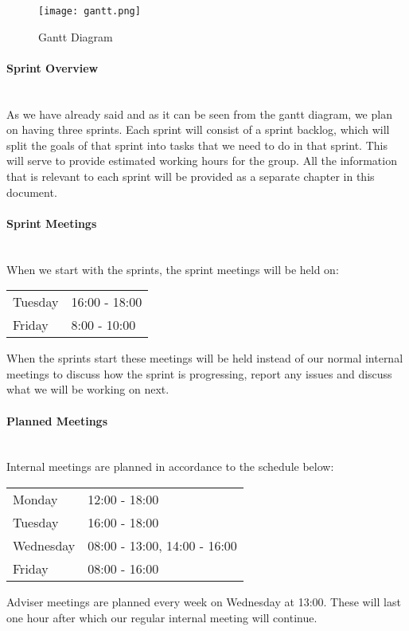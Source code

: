 \documentclass[../document.tex]{subfiles}
\begin{document}
\begin{figure}[H]
\centering
\texttt{[image: gantt.png]}
\caption{Gantt Diagram}
\end{figure}

\paragraph{Sprint Overview} \ \\
As we have already said and as it can be seen from the gantt diagram, we plan on having three sprints. Each sprint will consist of a sprint backlog, which will split the goals of that sprint into tasks that we need to do in that sprint. This will serve to provide estimated working hours for the group. All the information that is relevant to each sprint will be provided as a separate chapter in this document. 

\paragraph{Sprint Meetings} \ \\
When we start with the sprints, the sprint meetings will be held on:

\begin{table}[H]
\begin{tabular}{ll}
\hline
Tuesday	&	16:00 - 18:00 \\
Friday		&	8:00 - 10:00 \\
\hline
\end{tabular}
\end{table}
When the sprints start these meetings will be held instead of our normal internal meetings to discuss how the sprint is progressing, report any issues and discuss what we will be working on next.

\paragraph{Planned Meetings} \ \\
Internal meetings are planned in accordance to the schedule below:

\begin{table}[H]
\begin{tabular}{ll}
\hline
Monday 	&	12:00 - 18:00 \\
Tuesday 	&	16:00 - 18:00 \\
Wednesday 	&	08:00 - 13:00, 14:00 - 16:00 \\
Friday 	&	08:00 - 16:00 \\
\hline
\end{tabular}
\end{table}
Adviser meetings are planned every week on Wednesday at 13:00. These will last one hour after which our regular internal meeting will continue.
\end{document}
